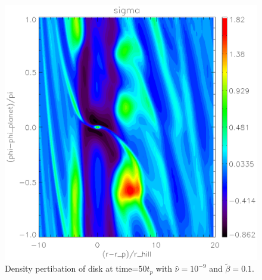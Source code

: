 
\begin{figure}
   \includegraphics[scale=.60]{figures/analysis_sigma50lowb.ps}
   \caption{Density pertibation of disk at time=$50t_p$ with $\hat{\nu}=10^{-9}$ and $\tilde{\beta}=0.1$. }
 \label{shortterm_lowb)}
 \end{figure}

